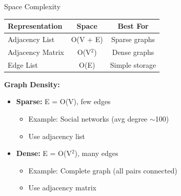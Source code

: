 \documentclass[aspectratio=169]{beamer}
\begin{document}
\begin{frame}{Space Complexity}
  \begin{table}
    \centering
    \begin{tabular}{|l|c|c|}
      \hline
      \textbf{Representation} & \textbf{Space} & \textbf{Best For} \\
      \hline
      Adjacency List & O(V + E) & Sparse graphs \\
      \hline
      Adjacency Matrix & O(V$^2$) & Dense graphs \\
      \hline
      Edge List & O(E) & Simple storage \\
      \hline
    \end{tabular}
  \end{table}

  \vspace{0.5cm}
  \textbf{Graph Density:}
  \begin{itemize}
    \item \textbf{Sparse:} E = O(V), few edges
      \begin{itemize}
        \item Example: Social networks (avg degree $\sim$100)
        \item Use adjacency list
      \end{itemize}
    \item \textbf{Dense:} E = O(V$^2$), many edges
      \begin{itemize}
        \item Example: Complete graph (all pairs connected)
        \item Use adjacency matrix
      \end{itemize}
  \end{itemize}
\end{frame}
\end{document}
